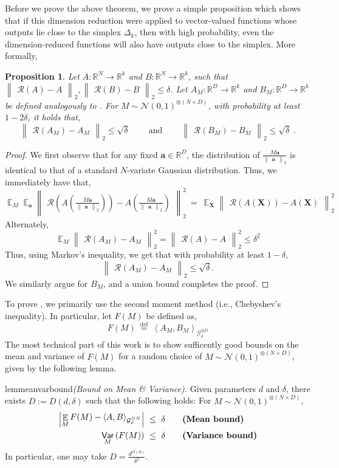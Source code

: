 \documentclass[11pt]{article}
\newcommand{\inparen}[1]{\left ( #1 \right )}
\newcommand{\inangle}[1]{\left \langle #1 \right \rangle}
\newcommand{\inabs}[1]{\begin{vmatrix} #1 \end{vmatrix}}
\newcommand{\norm}[2]{\begin{Vmatrix} #2 \end{Vmatrix}_{#1}}
\newcommand{\defeq}{\stackrel{\mathrm{def}}{=}}
\DeclareMathOperator*{\Ex}{\mathbb{E}}
\DeclareMathOperator*{\Var}{\mathsf{Var}}
\newcommand{\sAND}{\ \mathrm{and} \ }
\newcommand{\bbR}{{\mathbb R}}
\newcommand{\ba}{{\bm a}}
\newcommand{\bX}{\mathbf{X}}
\newcommand{\calG}{\mathcal{G}}
\newcommand{\calN}{\mathcal{N}}
\newcommand{\calR}{\mathcal{R}}
\newtheorem{proposition}[theorem]{Proposition}
\begin{document}
\noindent Before we prove the above theorem, we prove a simple proposition which shows that if this dimension reduction were applied to vector-valued functions whose outputs lie close to the simplex $\Delta_k$, then with high probability, even the dimension-reduced functions will also have outputs close to the simplex. More formally,

\begin{proposition}\label{prop:dim-red-close-to-simplex}
	Let $A : \bbR^N \to \bbR^k$ and $B: \bbR^N \to \bbR^k$, such that $\norm{2}{\calR(A) - A}, \norm{2}{\calR(B) - B} \le \delta$. Let $A_M : \bbR^D \to \bbR^k$ and $B_M : \bbR^D \to \bbR^k$ be defined analogously to . For $M \sim \calN(0,1)^{\otimes (N \times D)}$, with probability at least $1-2\delta$, it holds that,
	\[ \norm{2}{\calR(A_M) - A_M} \le \sqrt{\delta} \qquad \sAND \qquad \norm{2}{\calR(B_M) - B_M} \le \sqrt{\delta}\;. \]
\end{proposition}
\begin{proof}
	We first observe that for any fixed $\ba \in \bbR^D$, the distribution of $\frac{M\ba}{\norm{2}{\ba}}$ is identical to that of a standard $N$-variate Gaussian distribution. Thus, we immediately have that,
	\[ \Ex_M \Ex_{\ba} \norm{2}{\calR\inparen{A\inparen{\frac{M\ba}{\norm{2}{\ba}}}} - A\inparen{\frac{M\ba}{\norm{2}{\ba}}}}^2 ~=~ \Ex_{\bX} \norm{2}{\calR\inparen{A\inparen{\bX}} - A\inparen{\bX}}^2\]
	Alternately,
	\[ \Ex_M \norm{2}{\calR(A_M) - A_M}^2 = \norm{2}{\calR(A) - A}^2 \le \delta^2\]
	Thus, using Markov's inequality, we get that with probability at least $1 - \delta$,
	\[ \norm{2}{\calR(A_M) - A_M} \le \sqrt{\delta}. \]
	We similarly argue for $B_M$, and a union bound completes the proof.
\end{proof}

\noindent To prove , we primarily use the second moment method (i.e., Chebyshev's inequality). In particular, let $F(M)$ be defined as,
\[F(M) ~\defeq~ \inangle{A_M, B_M}_{\calG_{\rho}^{\otimes D}}\]
The most technical part of this work is to show sufficently good bounds on the mean and variance of $F(M)$ for a random choice of $M \sim \calN(0,1)^{\otimes (N \times D)}$, given by the following lemma.

\begin{restatable}{lem}{meanvarbound}{\em (Bound on Mean \& Variance).}\label{lem:mean_var_bound}
	Given parameters $d$ and $\delta$, there exists $D := D(d, \delta)$ such that the following holds: For $M \sim \calN(0,1)^{\otimes (N \times D)}$,
	\begin{align*}
	\inabs{\Ex\limits_{M} F(M) - \inangle{A, B}_{\calG_{\rho}^{\otimes N}}} &~\le~ \delta \qquad \text{\bf (Mean bound)}\\
	\Var_M \inparen{F(M)} &~\le~ \delta \qquad \text{\bf (Variance bound)}
	\end{align*}
	In particular, one may take $D = \frac{d^{O(d)}}{\delta^2}$.
\end{restatable}
\end{document}
